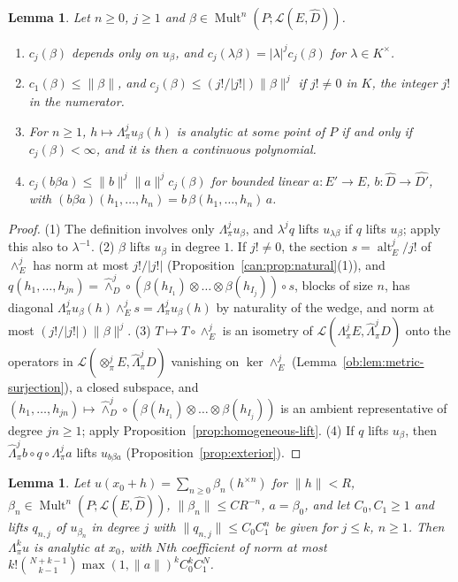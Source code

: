 \documentclass[11pt]{amsart}
\newtheorem{lemma}[theorem]{Lemma}
\theoremstyle{definition}
\theoremstyle{remark}
\numberwithin{equation}{section}
\newcommand{\cL}{\mathcal L}
\newcommand{\Mult}{\operatorname{Mult}}
\newcommand{\abs}[1]{\lvert #1\rvert}
\newcommand{\norm}[1]{\lVert #1\rVert}
\theoremstyle{plain}
\theoremstyle{definition}
\theoremstyle{plain}
\newcommand{\alt}{\operatorname{alt}}
\newcommand{\hLambda}{\widehat\Lambda}
\begin{document}
\begin{lemma}\label{fmo:lem:homogeneous}
Let $n\ge0$, $j\ge1$ and $\beta\in\Mult^n(P;\cL(E,\widehat D))$.
\begin{enumerate}
\item $c_j(\beta)$ depends only on $u_\beta$, and $c_j(\lambda\beta)=\abs\lambda^jc_j(\beta)$ for $\lambda\in K^\times$.
\item $c_1(\beta)\le\norm\beta$, and $c_j(\beta)\le(j!/\abs{j!})\norm\beta^j$ if $j!\ne0$ in $K$, the integer $j!$ in the
numerator.
\item For $n\ge1$, $h\mapsto\Lambda^j_\pi u_\beta(h)$ is analytic at some point of $P$ if and only if $c_j(\beta)<\infty$,
and it is then a continuous polynomial.
\item $c_j(b\beta a)\le\norm b^j\norm a^jc_j(\beta)$ for bounded linear $a\colon E'\to E$, $b\colon\widehat D\to\widehat{D'}$,
with $(b\beta a)(h_1,\allowbreak\dots,h_n)=b\,\beta(h_1,\allowbreak\dots,h_n)\,a$.
\end{enumerate}
\end{lemma}

\begin{proof}
(1) The definition involves only $\Lambda^j_\pi u_\beta$, and $\lambda^jq$ lifts $u_{\lambda\beta}$ if $q$ lifts $u_\beta$;
apply this also to $\lambda^{-1}$. (2) $\beta$ lifts $u_\beta$ in degree $1$. If $j!\ne0$, the section $s=\alt^j_E/j!$
of $\wedge^j_E$ has norm at most
$j!/\abs{j!}$ (Proposition~\ref{can:prop:natural}(1)), and $q(h_1,\dots,h_{jn})=\widehat\wedge^j_D\circ(\beta(h_{I_1})\otimes
\dots\otimes\beta(h_{I_j}))\circ s$, blocks of size $n$, has diagonal $\Lambda^j_\pi u_\beta(h)\wedge^j_Es=
\Lambda^j_\pi u_\beta(h)$ by naturality of the wedge, and norm at most $(j!/\abs{j!})\norm\beta^j$. (3) $T\mapsto
T\circ\wedge^j_E$ is an isometry of
$\cL(\Lambda^j_\pi E,\hLambda^j_\pi D)$ onto the operators in $\cL(\otimes^j_\pi E,\hLambda^j_\pi D)$ vanishing on
$\ker\wedge^j_E$ (Lemma~\ref{ob:lem:metric-surjection}), a closed subspace, and $(h_1,\dots,h_{jn})\mapsto
\widehat\wedge^j_D\circ(\beta(h_{I_1})\otimes\dots\otimes\beta(h_{I_j}))$ is an ambient representative of degree $jn\ge1$;
apply Proposition~\ref{prop:homogeneous-lift}. (4) If $q$ lifts $u_\beta$, then $\hLambda^j_\pi b\circ q\circ\Lambda^j_\pi a$
lifts $u_{b\beta a}$ (Proposition~\ref{prop:exterior}).
\end{proof}

\begin{lemma}\label{fmo:lem:assembly}
Let $u(x_0+h)=\sum_{n\ge0}\beta_n(h^{\times n})$ for $\norm h<R$, $\beta_n\in\Mult^n(P;\cL(E,\widehat D))$,
$\norm{\beta_n}\le CR^{-n}$, $a=\beta_0$, and let $C_0,C_1\ge1$ and lifts $q_{n,j}$ of $u_{\beta_n}$ in degree $j$ with
$\norm{q_{n,j}}\le C_0C_1^n$ be given for $j\le k$, $n\ge1$. Then $\Lambda^k_\pi u$ is analytic at $x_0$, with $N$th
coefficient of norm at most $k!\binom{N+k-1}{k-1}\max(1,\norm a)^kC_0^kC_1^N$.
\end{lemma}
\end{document}

